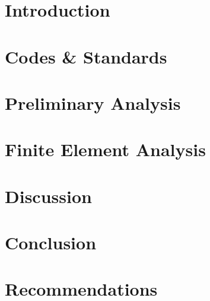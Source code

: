 
\chapter{Introduction}
	

\chapter{Codes \& Standards}
	

\chapter{Preliminary Analysis}
	

\chapter{Finite Element Analysis}
	

\chapter{Discussion}
	

\chapter{Conclusion}
	

\chapter{Recommendations}
	

%	
